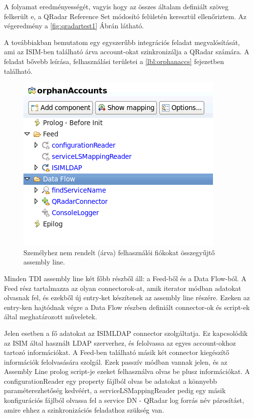 A folyamat eredményességét, vagyis hogy az összes általam definiált szöveg felkerült e, a QRadar Reference Set módosító felületén keresztül ellenőriztem. Az végeredmény a \ref{fig:qradartest1} Ábrán látható. 
 
A továbbiakban bemutatom egy egyszerűbb integrációs feladat megvalósítását, ami az ISIM-ben található árva account-okat szinkronizálja a QRadar számára. A feladat bővebb leírása, felhasználási területei a \ref{lbl:orphanaccs} fejezetben található. 

\begin{figure}[h]
	\centering
	\includegraphics[width=0.6\linewidth]{figures/conn_test/queryAssemblyLineSmall}
	\caption{Személyhez nem rendelt (árva) felhasználói fiókokat összegyűjtő assembly line.}
	\label{fig:queryassemblyline}
\end{figure}

Minden TDI assembly line két főbb részből áll: a Feed-ből és a Data Flow-ból. A Feed rész tartalmazza az olyan connectorok-at, amik iterator módban adatokat olvasnak fel, és ezekből új entry-ket készítenek az assembly line részére. Ezeken az entry-ken hajtódnak végre a Data Flow részben definiált connector-ok és script-ek által meghatározott műveletek.

Jelen esetben a fő adatokat az ISIMLDAP connector szolgáltatja. Ez kapcsolódik az ISIM által használt LDAP szerverhez, és felolvassa az egyes account-okhoz tartozó információkat. A Feed-ben található másik két connector kiegészítő információk felolvasására szolgál. Ezek passzív módban vannak jelen, és az Assembly Line prolog script-je ezeket felhasználva olvas be plusz információkat. A configurationReader egy property fájlból olvas be adatokat a könnyebb paraméterezhetőség kedvéért, a serviceLSMappingReader pedig egy másik konfigurációs fájlból olvassa fel a service DN - QRadar log forrás név párosítást, amire ehhez a szinkronizációs feladathoz szükség van.

